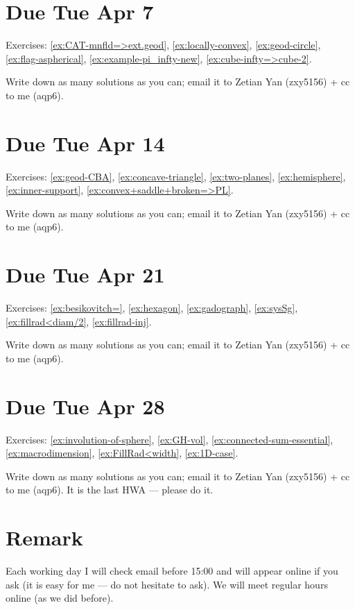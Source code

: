 \section{Due Tue Apr 7}

Exercises: 
\ref{ex:CAT-mnfld=>ext.geod},
\ref{ex:locally-convex},
\ref{ex:geod-circle},
\ref{ex:flag-aspherical},
\ref{ex:example-pi_infty-new},
\ref{ex:cube-infty=>cube-2}.

Write down as many solutions as you can; email it to Zetian Yan (zxy5156) + cc to me (aqp6).

\section{Due Tue Apr 14}

Exercises: 
\ref{ex:geod-CBA},
\ref{ex:concave-triangle},
\ref{ex:two-planes},
\ref{ex:hemisphere},
\ref{ex:inner-support},
\ref{ex:convex+saddle+broken=>PL}.

Write down as many solutions as you can; email it to Zetian Yan (zxy5156) + cc to me (aqp6).

\section{Due Tue Apr 21}

Exercises:
\ref{ex:besikovitch=},
\ref{ex:hexagon},
\ref{ex:gadograph},
\ref{ex:sysSg},
\ref{ex:fillrad<diam/2},
\ref{ex:fillrad-inj}.

Write down as many solutions as you can; email it to Zetian Yan (zxy5156) + cc to me (aqp6).

\section{Due Tue Apr 28}

Exercises:
\ref{ex:involution-of-sphere},
\ref{ex:GH-vol},
\ref{ex:connected-sum-essential},
\ref{ex:macrodimension},
\ref{ex:FillRad<width},
\ref{ex:1D-case}.

Write down as many solutions as you can; email it to Zetian Yan (zxy5156) + cc to me (aqp6).
It is the last HWA --- please do it.


\section*{Remark}
Each working day I will check email before 15:00 and will appear online if you ask (it is easy for me --- do not hesitate to ask).
We will meet regular hours online (as we did before).
